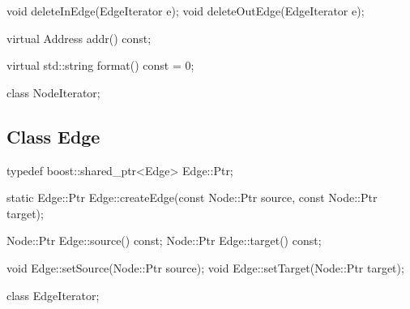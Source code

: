 \begin{apient}
void deleteInEdge(EdgeIterator e);
void deleteOutEdge(EdgeIterator e);
\end{apient}

\begin{apient}
virtual Address addr() const;
\end{apient}
    
\begin{apient}    
virtual std::string format() const = 0;
\end{apient}

\begin{apient}
class NodeIterator;
\end{apient}


\subsection{Class Edge}

\begin{apient}
typedef boost::shared_ptr<Edge> Edge::Ptr;
\end{apient}

\begin{apient}
static Edge::Ptr Edge::createEdge(const Node::Ptr source, const Node::Ptr target);
\end{apient}

\begin{apient}
Node::Ptr Edge::source() const; 
Node::Ptr Edge::target() const;
\end{apient}

\begin{apient}
void Edge::setSource(Node::Ptr source); 
void Edge::setTarget(Node::Ptr target);
\end{apient}

\begin{apient}
class EdgeIterator;
\end{apient}

